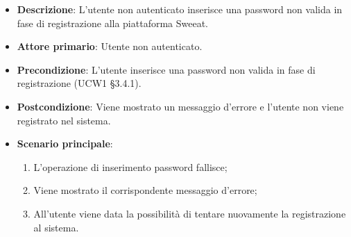 \begin{itemize}
\item \textbf{Descrizione}: L'utente non autenticato inserisce una password non valida in fase di registrazione alla piattaforma Sweeat.
\item \textbf{Attore primario}: Utente non autenticato.
\item \textbf{Precondizione}: L'utente inserisce una password non valida in fase di registrazione (UCW1 §3.4.1).
\item \textbf{Postcondizione}: Viene mostrato un messaggio d'errore e l'utente non viene registrato nel sistema.

\item \textbf{Scenario principale}:
\begin{enumerate}
\item L'operazione di inserimento password fallisce;
\item Viene mostrato il corrispondente messaggio d'errore;
\item All'utente viene data la possibilità di tentare nuovamente la registrazione al sistema.
\end{enumerate}
\end{itemize}
